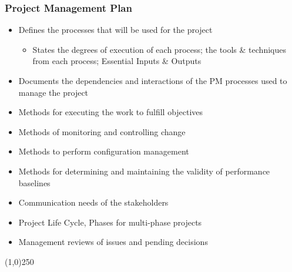 \begin{frame}
\frametitle{Project Management Plan}
\begin{itemize}
	\item Defines the processes that will be used for the project
		\begin{itemize}
			\item States the degrees of execution of each process; the tools \& techniques from each process; Essential Inputs \& Outputs
		\end{itemize}
	\item Documents the dependencies and interactions of the PM processes used to manage the project
	\item Methods for executing the work to fulfill objectives
	\item Methods of monitoring and controlling change
	\item Methods to perform configuration management
	\item Methods for determining and maintaining the validity of performance baselines
	\item Communication needs of the stakeholders
	\item Project Life Cycle, Phases for multi-phase projects
	\item Management reviews of issues and pending decisions
\end{itemize}
\end{frame}\begin{center}\line(1,0){250}\end{center}
%
%


